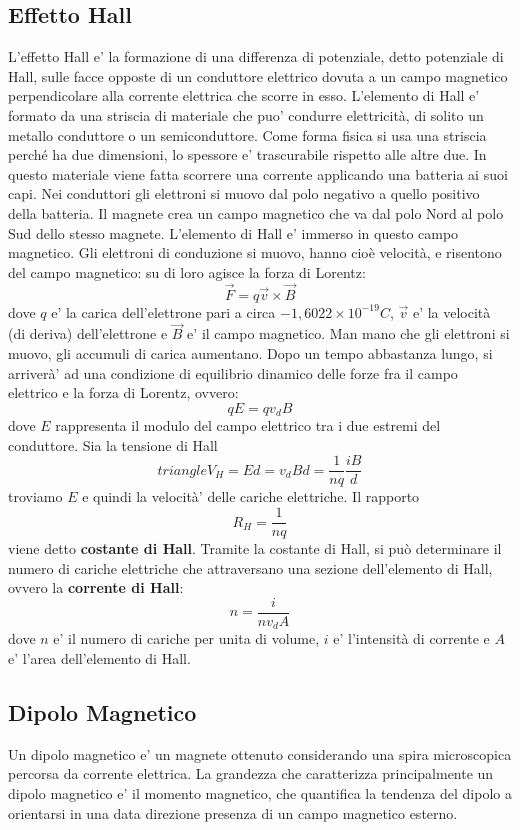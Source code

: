\documentclass[a4paper, 10pt]{article}
\begin{document}
		\subsection{Effetto Hall}
			L'effetto Hall e' la formazione di una differenza di potenziale, detto potenziale di Hall, sulle facce opposte 
			di un conduttore elettrico dovuta a un campo magnetico perpendicolare alla corrente elettrica che scorre in esso.
			L'elemento di Hall e' formato da una striscia di materiale che puo' condurre elettricità, di solito un metallo
			conduttore o un semiconduttore. Come forma fisica si usa una striscia perché ha due dimensioni, lo spessore e'
		    trascurabile rispetto alle altre due. In questo materiale viene fatta scorrere una corrente applicando una batteria 
		    ai suoi capi. Nei conduttori gli elettroni si muovo dal polo negativo a quello positivo della batteria. Il magnete 
		    crea un campo magnetico che va dal polo Nord al polo Sud dello stesso magnete. L'elemento di Hall e' immerso in 
		    questo campo magnetico. Gli elettroni di conduzione si muovo, hanno cioè velocità, e risentono del campo 
		    magnetico: su di loro agisce la forza di Lorentz:
		    \[ \overrightarrow{F} = q\overrightarrow{v} \times \overrightarrow{B}\] dove $q$ e' la carica dell'elettrone pari a
		    circa $-1,6022 \times 10^{-19} C$, $\overrightarrow{v}$ e' la velocità (di deriva) dell'elettrone 
		    e $\overrightarrow{B}$ e' il campo magnetico. Man mano che gli elettroni si muovo, gli accumuli di carica aumentano.
		    Dopo un tempo abbastanza lungo, si arriverà' ad una condizione di equilibrio dinamico delle forze 
		    fra il campo elettrico e la forza di Lorentz, ovvero: \[ qE = qv_dB \] dove $E$ rappresenta il modulo del campo
		    elettrico tra i due estremi del conduttore. Sia la tensione di Hall 
		    \[triangle V_H = Ed = v_d Bd = \frac{1}{nq}\frac{iB}{d} \] troviamo $E$ e quindi la velocità' delle cariche elettriche.
		    Il rapporto \[ R_H = \frac{1}{nq} \] viene detto \textbf{costante di Hall}. Tramite la costante di Hall, si può
		    determinare il numero di cariche elettriche che attraversano una sezione dell'elemento di Hall, ovvero 
		    la \textbf{corrente di Hall}:
		    \[ n = \frac{i}{nv_d A}\] dove $n$ e' il numero di cariche per unita di volume, $i$ e' l'intensità di corrente 
		    e $A$ e' l'area dell'elemento di Hall.
		\subsection{Dipolo Magnetico}
			Un dipolo magnetico e' un magnete ottenuto considerando una spira microscopica percorsa da corrente elettrica. 
			La grandezza che caratterizza principalmente un dipolo magnetico e' il momento magnetico, 
			che quantifica la tendenza del dipolo a orientarsi in una data direzione presenza di un campo magnetico esterno.
\end{document}
